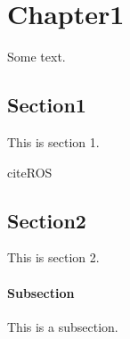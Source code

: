 \chapter{Chapter1}
\label{sec:chapter_1}

Some text.

\section{Section1}
\label{sec:c1_s1}

This is section 1.

cite{ROS}

\newpage
\section{Section2}
\label{sec:c1_s2}

This is section 2.

\subsubsection{Subsection}
This is a subsection.